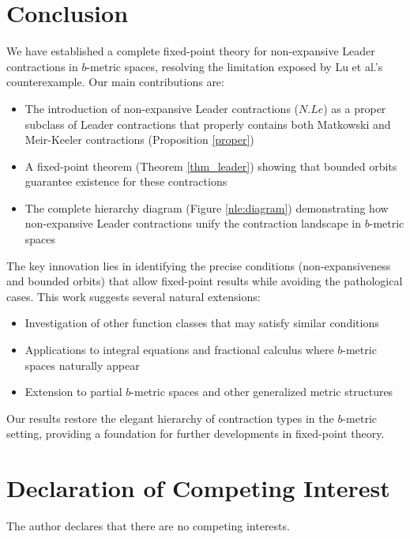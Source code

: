 \documentclass{birkjour}
\theoremstyle{definition}
\theoremstyle{remark}
\numberwithin{equation}{section}
\begin{document}
\section{Conclusion}

We have established a complete fixed-point theory for non-expansive Leader contractions in $b$-metric spaces, resolving the limitation exposed by Lu et al.'s counterexample. Our main contributions are:

\begin{itemize}
\item The introduction of non-expansive Leader contractions ($N.Le$) as a proper subclass of Leader contractions that properly contains both Matkowski and Meir-Keeler contractions (Proposition \ref{proper})

\item A fixed-point theorem (Theorem \ref{thm_leader}) showing that bounded orbits guarantee existence for these contractions

\item The complete hierarchy diagram (Figure \ref{nle:diagram}) demonstrating how non-expansive Leader contractions unify the contraction landscape in $b$-metric spaces
\end{itemize}

The key innovation lies in identifying the precise conditions (non-expansiveness and bounded orbits) that allow fixed-point results while avoiding the pathological cases. This work suggests several natural extensions:

\begin{itemize}
\item Investigation of other function classes that may satisfy similar conditions
\item Applications to integral equations and fractional calculus where $b$-metric spaces naturally appear
\item Extension to partial $b$-metric spaces and other generalized metric structures
\end{itemize}

Our results restore the elegant hierarchy of contraction types in the $b$-metric setting, providing a foundation for further developments in fixed-point theory.
\newpage
\vspace{0.5cm}
\section*{Declaration of Competing Interest}
\noindent The author declares that there are no competing interests.
\end{document}

